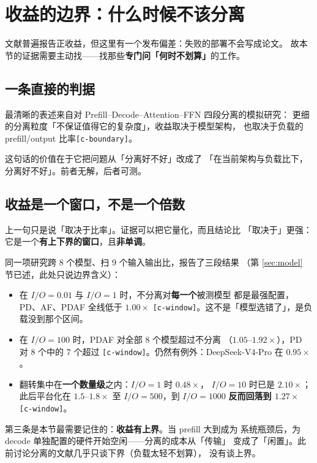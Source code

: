 \section{收益的边界：什么时候不该分离}
\label{sec:boundary}

文献普遍报告正收益，但这里有一个发布偏差：失败的部署不会写成论文。
故本节的证据需要主动找——找那些\textbf{专门问「何时不划算」}的工作。

\subsection{一条直接的判据}

最清晰的表述来自对 Prefill--Decode--Attention--FFN 四段分离的模拟研究：
更细的分离粒度「不保证值得它的复杂度」，收益取决于模型架构，
也取决于负载的 prefill/output 比率\texttt{[c-boundary]}。

这句话的价值在于它把问题从「分离好不好」改成了
「在当前架构与负载比下，分离好不好」。前者无解，后者可测。

\subsection{收益是一个窗口，不是一个倍数}

上一句只是说「取决于比率」。证据可以把它量化，而且结论比
「取决于」更强：它是一个\textbf{有上下界的窗口}，且\textbf{非单调}。

同一项研究跨 8 个模型、扫 9 个输入输出比，报告了三段结果
（第 \ref{sec:model} 节已述，此处只说边界含义）：

\begin{itemize}
\item 在 $I/O = 0.01$ 与 $I/O = 1$ 时，不分离对\textbf{每一个}被测模型
  都是最强配置，PD、AF、PDAF 全线低于 $1.00\times$
  \texttt{[c-window]}。这不是「模型选错了」，是负载没到那个区间。
\item 在 $I/O = 100$ 时，PDAF 对全部 8 个模型超过不分离
  （$1.05$--$1.92\times$），PD 对 8 个中的 7 个超过
  \texttt{[c-window]}。仍然有例外：DeepSeek-V4-Pro 在 $0.95\times$。
\item 翻转集中在\textbf{一个数量级}之内：$I/O=1$ 时 $0.48\times$，
  $I/O=10$ 时已是 $2.10\times$；此后平台化在 $1.5$--$1.8\times$
  至 $I/O=500$，到 $I/O=1000$ \textbf{反而回落到 $1.27\times$}
  \texttt{[c-window]}。
\end{itemize}

第三条是本节最需要记住的：\textbf{收益有上界}。当 prefill 大到成为
系统瓶颈后，为 decode 单独配置的硬件开始空闲——分离的成本从「传输」
变成了「闲置」。此前讨论分离的文献几乎只谈下界（负载太轻不划算），
没有谈上界。

